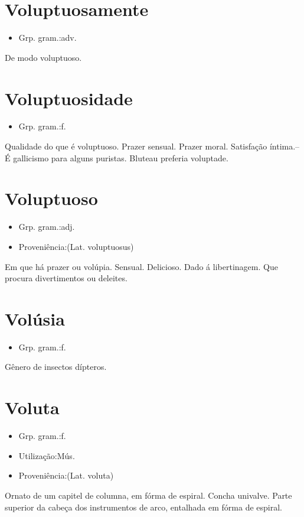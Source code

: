 \documentclass{article}
\begin{document}
\section{Voluptuosamente}
\begin{itemize}
\item {Grp. gram.:adv.}
\end{itemize}
De modo voluptuoso.
\section{Voluptuosidade}
\begin{itemize}
\item {Grp. gram.:f.}
\end{itemize}
Qualidade do que é voluptuoso.
Prazer sensual.
Prazer moral.
Satisfação íntima.--É gallicismo para alguns puristas. Bluteau preferia \textunderscore voluptade\textunderscore .
\section{Voluptuoso}
\begin{itemize}
\item {Grp. gram.:adj.}
\end{itemize}
\begin{itemize}
\item {Proveniência:(Lat. \textunderscore voluptuosus\textunderscore )}
\end{itemize}
Em que há prazer ou volúpia.
Sensual.
Delicioso.
Dado á libertinagem.
Que procura divertimentos ou deleites.
\section{Volúsia}
\begin{itemize}
\item {Grp. gram.:f.}
\end{itemize}
Gênero de insectos dípteros.
\section{Voluta}
\begin{itemize}
\item {Grp. gram.:f.}
\end{itemize}
\begin{itemize}
\item {Utilização:Mús.}
\end{itemize}
\begin{itemize}
\item {Proveniência:(Lat. \textunderscore voluta\textunderscore )}
\end{itemize}
Ornato de um capitel de columna, em fórma de espiral.
Concha univalve.
Parte superior da cabeça dos instrumentos de arco, entalhada em fórma de espiral.
\end{document}
